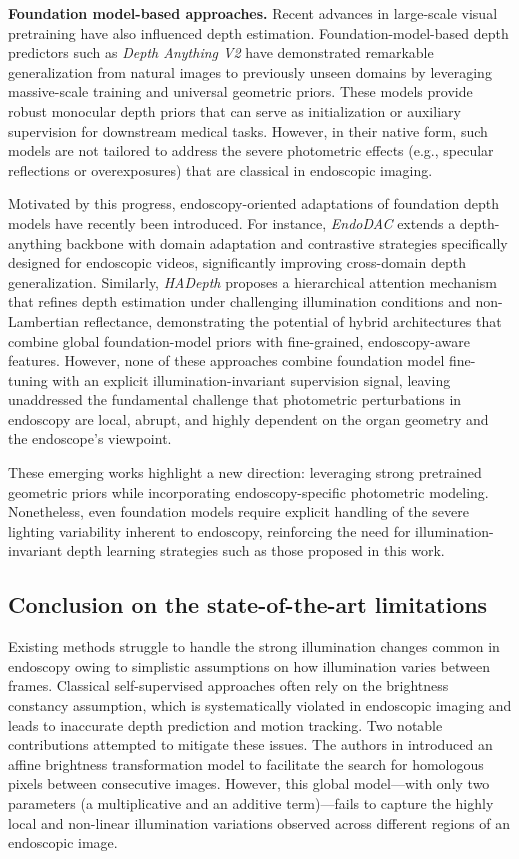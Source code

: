 \documentclass[a4paper,fleqn]{cas-dc}
\begin{document}
\textbf{Foundation model-based approaches.}  
Recent advan\-ces in large-scale visual pretraining have also influenced depth estimation. Foundation-model-based depth predictors such as \emph{Depth Anything V2} \citep{DepthAnythingV2_2024} have demonstrated remarkable generalization from natural images to previously unseen domains by leveraging massive-scale training and universal geometric priors. These models provide robust monocular depth priors that can serve as initialization or auxiliary supervision for downstream medical tasks. However, in their native form, such models are not tailored to address the severe photometric effects (e.g., specular reflections or overexposures) that are classical in endoscopic imaging.

%
Motivated by this progress, endoscopy-oriented adaptations of foundation depth models have recently been introduced. For instance, \emph{EndoDAC} \citep{EndoDAC_MICCAI_2024} extends a depth-anything backbone with domain adaptation and contrastive strategies specifically designed for endoscopic videos, significantly improving cross-domain depth generalization. Similarly, \emph{HADepth} \citep{HAdepth_2025} proposes a hierarchical attention mechanism that refines depth estimation under challenging illumination conditions and non-Lambertian reflectance, demonstrating the potential of hybrid architectures that combine global foundation-model priors with fine-grained, endoscopy-aware features.
%
However, none of these approaches combine foundation model fine-tuning with an explicit illumination-invariant supervision signal, leaving unaddressed the fundamental 
challenge that photometric perturbations in endoscopy are local, abrupt, and highly dependent on the organ geometry and the endoscope's viewpoint.

%
These emerging works highlight a new direction: leveraging strong pretrained geometric priors while incorporating endoscopy-specific photometric modeling. Nonetheless, even foundation models require explicit handling of the severe lighting variability inherent to endoscopy, reinforcing the need for illumination-invariant depth learning strategies such as those proposed in this work.

\subsection{Conclusion on the state-of-the-art limitations}

Existing methods struggle to handle the strong illumination changes common in endoscopy owing to simplistic assumptions on how illumination varies between frames. Classical self-supervised approaches often rely on the brightness constancy assumption, which is systematically violated in endoscopic imaging and leads to inaccurate depth prediction and motion tracking. Two notable contributions attempted to mitigate these issues. The authors in \citep{Ozyoruk_MIA_2021} introduced an affine brightness transformation model to facilitate the search for homologous pixels between consecutive images. However, this global model---with only two parameters (a multiplicative and an additive term)---fails to capture the highly local and non-linear illumination variations observed across different regions of an endoscopic image.  
\end{document}
